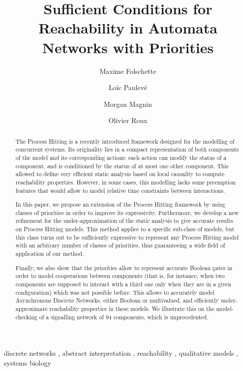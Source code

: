 \documentclass{elsarticle}
\begin{document}
\begin{frontmatter}
\title{Sufficient Conditions for Reachability in Automata Networks with Priorities}

\author[irccyn]{Maxime Folschette}
\author[lri,amib]{Loïc Paulevé}
\author[irccyn]{Morgan Magnin}
\author[irccyn]{Olivier Roux}

\address[irccyn]{LUNAM Universit\'e, \'Ecole Centrale de Nantes, IRCCyN UMR CNRS 6597\\
(Institut de Recherche en Communications et Cybern\'etique de Nantes)\\
1 rue de la No\"e - B.P. 92101 - 44321 Nantes Cedex 3, France.}

\address[lri]{CNRS, Laboratoire de Recherche en Informatique (LRI)\\
		Université Paris-Sud - CNRS UMR 8623, France}
\address[amib]{AMIB group, Inria Saclay, France}{}



\begin{abstract}
The Process Hitting is a recently introduced framework designed for the modelling of concurrent systems.
Its originality lies in a compact representation of both components of the model and its corresponding actions:
each action can modify the status of a component, and is conditioned by the status of at most one other component.
This allowed to define very efficient static analysis based on local causality to compute reachability properties.
However, in some cases, this modelling lacks some preemption features
that would allow to model relative time constraints between interactions.

In this paper, we propose an extension of the Process Hitting framework
by using classes of priorities in order to improve its expressivity.
Furthermore, we develop a new refinement for the under-approximation of the static analysis
to give accurate results on Process Hitting models.
This method applies to a specific sub-class of models,
but this class turns out to be sufficiently expressive to represent any
Process Hitting model with an arbitrary number of classes of priorities,
thus guaranteeing a wide field of application of our method.

Finally, we also show that the priorities
allow to represent accurate Boolean gates in order to model
cooperations between components
(that is, for instance, when two components are supposed to interact with a third one
only when they are in a given configuration)
which was not possible before.
This allows to accurately model
Asynchronous Discrete Networks, either Boolean or multivalued,
and efficiently under-approximate reachability properties
in these models.
We illustrate this on the model-checking of a signalling network of 94
components, which is unprecedented.
\end{abstract}
\begin{keyword}
discrete networks \sep
abstract interpretation \sep
reachability \sep
qualitative models \sep
systems biology
\end{keyword}
\end{frontmatter}
\end{document}
